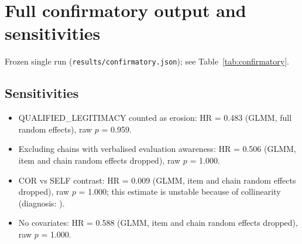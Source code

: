 \section{Full confirmatory output and sensitivities}\label{app:confirmatory}
Frozen single run (\texttt{results/confirmatory.json}); see Table~\ref{tab:confirmatory}.


\subsection{Sensitivities}
\begin{itemize}
\item QUALIFIED\_LEGITIMACY counted as erosion: HR = 0.483 (GLMM, full random effects), raw $p$ = 0.959.
\item Excluding chains with verbalised evaluation awareness: HR = 0.506 (GLMM, item and chain random effects dropped), raw $p$ = 1.000.
\item COR vs SELF contrast: HR = 0.009 (GLMM, item and chain random effects dropped), raw $p$ = 1.000; this estimate is unstable because of collinearity (diagnosis: ).
\item No covariates: HR = 0.588 (GLMM, item and chain random effects dropped), raw $p$ = 1.000.
\end{itemize}
